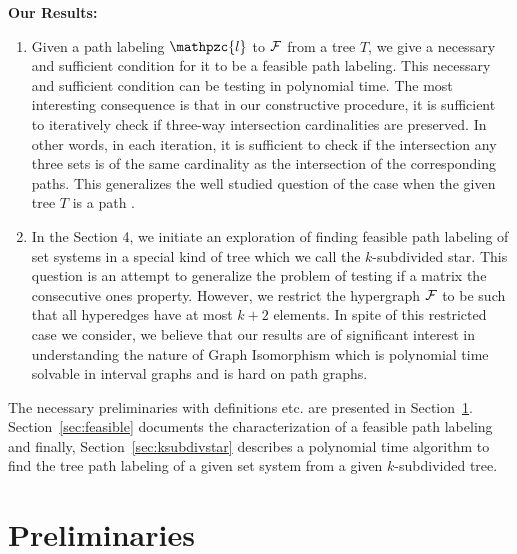\documentclass[11pt,
               envcountsect,
               envcountsame]
               {../lib/llncs2e/llncs}
\def\cF{{\cal F}}
\def\cl{\mathpzc{l}}
\begin{document}
\noindent 
{\bf Our Results:}
\begin{enumerate}
\item Given a path labeling $\cl$ to $\cF$ from a tree $T$, we give a
  necessary and sufficient condition for it to be a feasible path
  labeling.  This necessary and sufficient condition can be testing in
  polynomial time.  The most interesting consequence is that in our
  constructive procedure, it is sufficient to iteratively check if
  three-way intersection cardinalities are preserved.  In other words,
  in each iteration, it is sufficient to check if the intersection any
  three sets is of the same cardinality as the intersection of the
  corresponding paths.  This generalizes the well studied question of
  the case when the given tree $T$ is a path \cite{wlh02,nsnrs09}.
\item In the Section 4, we initiate an exploration of finding feasible
  path labeling of set systems in a special kind of tree which we call
  the $k$-subdivided star.  This question is an attempt to generalize
  the problem of testing if a matrix the consecutive ones property.
  However, we restrict the hypergraph $\cF$ to be such that all
  hyperedges have at most $k+2$ elements.  In spite of this restricted
  case we consider, we believe that our results are of significant
  interest in understanding the nature of Graph Isomorphism which is
  polynomial time solvable in interval graphs and is hard on path
  graphs.
\end{enumerate}
 The necessary preliminaries with definitions
etc. are presented in
Section~\ref{sec:prelims}. Section~\ref{sec:feasible} documents the
characterization of a feasible path labeling and finally,
Section~\ref{sec:ksubdivstar} describes a polynomial time algorithm to
find the tree path labeling of a given set system from a given
$k$-subdivided tree.

\section{Preliminaries} 
\label{sec:prelims} 
\end{document}
